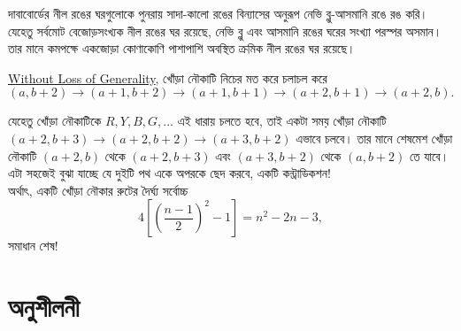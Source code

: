 \documentclass[11pt]{report}
\begin{document}
দাবাবোর্ডের নীল রঙের ঘরগুলোকে পুনরায় সাদা-কালো রঙের বিন্যাসের অনুরূপ নেভি ব্লু-আসমানি রঙে রঙ করি। যেহেতু সর্বমোট বেজোড়সংখ্যক নীল রঙের ঘর রয়েছে, নেভি ব্লু এবং আসমানি রঙের ঘরের সংখ্যা পরস্পর অসমান। তার মানে কমপক্ষে একজোড়া কোণাকোণি পাশাপাশি অবস্থিত ক্রমিক নীল রঙের ঘর রয়েছে।\\

\begin{center}
\end{center}

\href{https://en.wikipedia.org/wiki/Without_loss_of_generality}{Without Loss of Generality}, খোঁড়া নৌকাটি নিচের মত করে চলাচল করে
$$(a,b+2) \to (a+1,b+2) \to (a+1,b+1) \to (a+2,b+1) \to (a+2,b).$$

যেহেতু খোঁড়া নৌকাটিকে $R, Y, B, G, \ldots$ এই ধারায় চলতে হবে, তাই একটা সময় খোঁড়া নৌকাটি $(a+2,b+3)\to(a+2,b+2)\to(a+3,b+2)$ এভাবে চলবে। তার মানে শেষমেশ খোঁড়া নৌকাটি $(a+2,b)$ থেকে $(a+2,b+3)$ এবং $(a+3,b+2)$ থেকে $(a,b+2)$ তে যাবে। এটা সহজেই বুঝা যাচ্ছে যে দুইটি পথ একে অপরকে ছেদ করবে, একটি কন্ট্রাডিকশন!\\

অর্থাৎ, একটি খোঁড়া নৌকার রুটের দৈর্ঘ্য সর্বোচ্চ $$4\left[\left(\frac{n-1}2\right)^2-1\right]=n^2-2n-3,$$ সমাধান শেষ!

\newpage

\section{অনুশীলনী}
\end{document}
